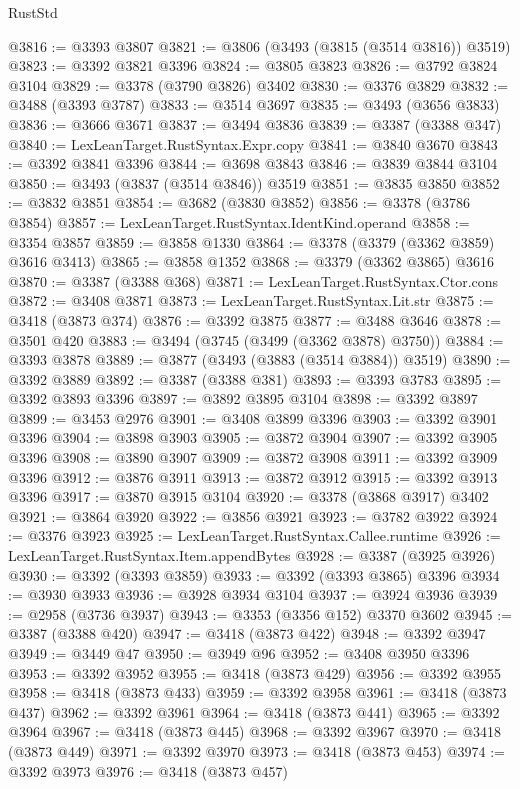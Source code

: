 \begin{lexlean}{RustStd}
\begin{coremodule}
@3816 := @3393 @3807
@3821 := @3806 (@3493 (@3815 (@3514 @3816)) @3519)
@3823 := @3392 @3821 @3396
@3824 := @3805 @3823
@3826 := @3792 @3824 @3104
@3829 := @3378 (@3790 @3826) @3402
@3830 := @3376 @3829
@3832 := @3488 (@3393 @3787)
@3833 := @3514 @3697
@3835 := @3493 (@3656 @3833)
@3836 := @3666 @3671
@3837 := @3494 @3836
@3839 := @3387 (@3388 @347)
@3840 := LexLeanTarget.RustSyntax.Expr.copy
@3841 := @3840 @3670
@3843 := @3392 @3841 @3396
@3844 := @3698 @3843
@3846 := @3839 @3844 @3104
@3850 := @3493 (@3837 (@3514 @3846)) @3519
@3851 := @3835 @3850
@3852 := @3832 @3851
@3854 := @3682 (@3830 @3852)
@3856 := @3378 (@3786 @3854)
@3857 := LexLeanTarget.RustSyntax.IdentKind.operand
@3858 := @3354 @3857
@3859 := @3858 @1330
@3864 := @3378 (@3379 (@3362 @3859) @3616 @3413)
@3865 := @3858 @1352
@3868 := @3379 (@3362 @3865) @3616
@3870 := @3387 (@3388 @368)
@3871 := LexLeanTarget.RustSyntax.Ctor.cons
@3872 := @3408 @3871
@3873 := LexLeanTarget.RustSyntax.Lit.str
@3875 := @3418 (@3873 @374)
@3876 := @3392 @3875
@3877 := @3488 @3646
@3878 := @3501 @420
@3883 := @3494 (@3745 (@3499 (@3362 @3878) @3750))
@3884 := @3393 @3878
@3889 := @3877 (@3493 (@3883 (@3514 @3884)) @3519)
@3890 := @3392 @3889
@3892 := @3387 (@3388 @381)
@3893 := @3393 @3783
@3895 := @3392 @3893 @3396
@3897 := @3892 @3895 @3104
@3898 := @3392 @3897
@3899 := @3453 @2976
@3901 := @3408 @3899 @3396
@3903 := @3392 @3901 @3396
@3904 := @3898 @3903
@3905 := @3872 @3904
@3907 := @3392 @3905 @3396
@3908 := @3890 @3907
@3909 := @3872 @3908
@3911 := @3392 @3909 @3396
@3912 := @3876 @3911
@3913 := @3872 @3912
@3915 := @3392 @3913 @3396
@3917 := @3870 @3915 @3104
@3920 := @3378 (@3868 @3917) @3402
@3921 := @3864 @3920
@3922 := @3856 @3921
@3923 := @3782 @3922
@3924 := @3376 @3923
@3925 := LexLeanTarget.RustSyntax.Callee.runtime
@3926 := LexLeanTarget.RustSyntax.Item.appendBytes
@3928 := @3387 (@3925 @3926)
@3930 := @3392 (@3393 @3859)
@3933 := @3392 (@3393 @3865) @3396
@3934 := @3930 @3933
@3936 := @3928 @3934 @3104
@3937 := @3924 @3936
@3939 := @2958 (@3736 @3937)
@3943 := @3353 (@3356 @152) @3370 @3602
@3945 := @3387 (@3388 @420)
@3947 := @3418 (@3873 @422)
@3948 := @3392 @3947
@3949 := @3449 @47
@3950 := @3949 @96
@3952 := @3408 @3950 @3396
@3953 := @3392 @3952
@3955 := @3418 (@3873 @429)
@3956 := @3392 @3955
@3958 := @3418 (@3873 @433)
@3959 := @3392 @3958
@3961 := @3418 (@3873 @437)
@3962 := @3392 @3961
@3964 := @3418 (@3873 @441)
@3965 := @3392 @3964
@3967 := @3418 (@3873 @445)
@3968 := @3392 @3967
@3970 := @3418 (@3873 @449)
@3971 := @3392 @3970
@3973 := @3418 (@3873 @453)
@3974 := @3392 @3973
@3976 := @3418 (@3873 @457)

\end{coremodule}
\end{lexlean}
